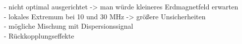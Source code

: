 - nicht optimal ausgerichtet -> man würde kleineres Erdmagnetfeld erwarten \\
- lokales Extremum bei 10 und 30 MHz -> größere Unsicherheiten \\
- mögliche Mischung mit Dispersionssignal \\
- Rückkopplungseffekte 
